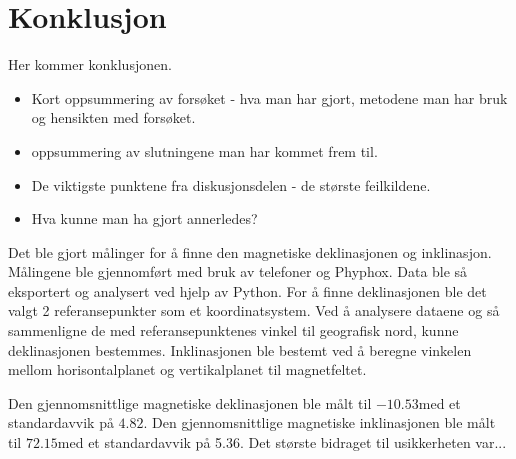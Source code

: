 \section{Konklusjon}
Her kommer konklusjonen.

\begin{itemize}
    \item Kort oppsummering av forsøket - hva man har gjort, metodene man har bruk og hensikten med forsøket. 
    \item oppsummering av slutningene man har kommet frem til.
    \item De viktigste punktene fra diskusjonsdelen - de største feilkildene. 
    \item Hva kunne man ha gjort annerledes?
\end{itemize}

Det ble gjort målinger for å finne den magnetiske deklinasjonen og inklinasjon. Målingene ble gjennomført med bruk av telefoner og Phyphox. Data ble så eksportert og analysert ved hjelp av Python. For å finne deklinasjonen ble det valgt 2 referansepunkter som et koordinatsystem. Ved å analysere dataene og så sammenligne de med referansepunktenes vinkel til geografisk nord, kunne deklinasjonen bestemmes. Inklinasjonen ble bestemt ved å beregne vinkelen mellom horisontalplanet og vertikalplanet til magnetfeltet. 

Den gjennomsnittlige magnetiske deklinasjonen ble målt til $-10.53$\textdegrees med et standardavvik på $4.82$. Den gjennomsnittlige magnetiske inklinasjonen ble målt til $72.15$\textdegrees med et standardavvik på 5.36. Det største bidraget til usikkerheten var...